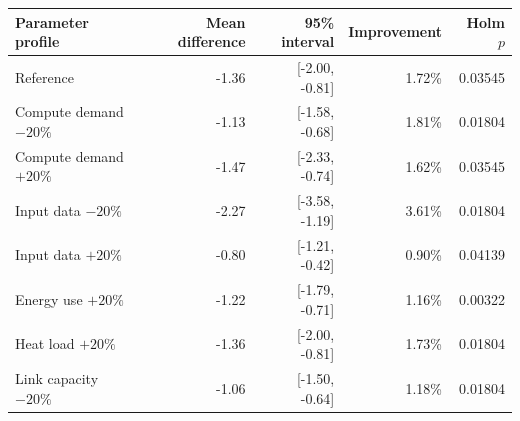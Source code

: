 \begin{tabular}{lrrrr}
\toprule
Parameter profile & Mean difference & 95\% interval & Improvement & Holm $p$ \\
\midrule
Reference & -1.36 & [-2.00, -0.81] & 1.72\% & 0.03545 \\
Compute demand $-20\%$ & -1.13 & [-1.58, -0.68] & 1.81\% & 0.01804 \\
Compute demand $+20\%$ & -1.47 & [-2.33, -0.74] & 1.62\% & 0.03545 \\
Input data $-20\%$ & -2.27 & [-3.58, -1.19] & 3.61\% & 0.01804 \\
Input data $+20\%$ & -0.80 & [-1.21, -0.42] & 0.90\% & 0.04139 \\
Energy use $+20\%$ & -1.22 & [-1.79, -0.71] & 1.16\% & 0.00322 \\
Heat load $+20\%$ & -1.36 & [-2.00, -0.81] & 1.73\% & 0.01804 \\
Link capacity $-20\%$ & -1.06 & [-1.50, -0.64] & 1.18\% & 0.01804 \\
\bottomrule
\end{tabular}